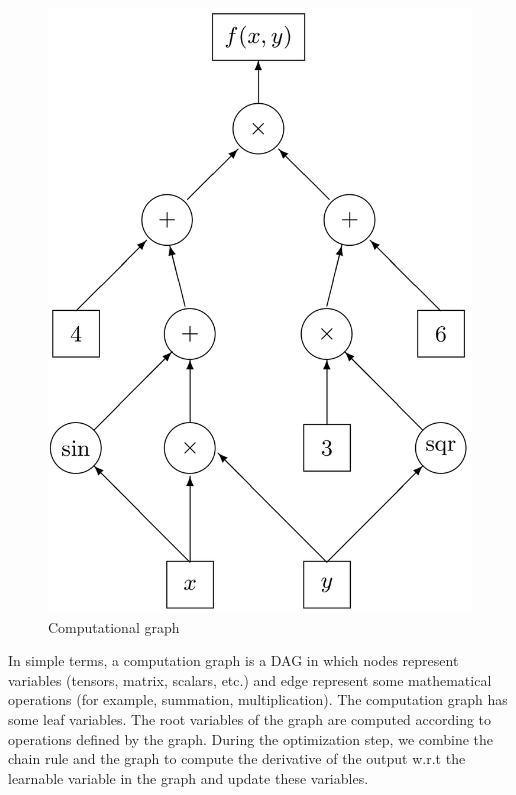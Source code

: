 \documentclass{pracamgr}
\numberwithin{equation}{section}
\begin{document}
\begin{figure}[H] \centering
\includegraphics[scale=0.4]{Computational_graph}
\caption[Computational graph]{Computational graph\footnotemark}
\label{Computational_graph}
\end{figure} 


In simple terms, a computation graph is a DAG in which nodes represent variables (tensors, matrix, scalars, etc.) and edge represent some mathematical operations (for example, summation, multiplication). The computation graph has some leaf variables. The root variables of the graph are computed according to operations defined by the graph. During the optimization step, we combine the chain rule and the graph to compute the derivative of the output w.r.t the learnable variable in the graph and update these variables.
\end{document}
